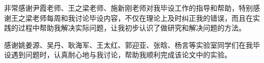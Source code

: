 
\begin{ack}
  非常感谢尹霞老师、王之梁老师、施新刚老师对我毕设工作的指导和帮助，特别感谢王之梁老师每周和我讨论毕设内容，不仅在理论上及时纠正我的错误，而且在实践的过程中帮助我解决实际问题，让我初步认识了做研究和解决问题的方法。

  感谢姚姜源、吴丹、耿海军、王太红、郭迎亚、张晗、杨言等实验室同学们在我毕设遇到问题时，认真耐心地与我讨论，帮助我顺利完成该论文中的实验。
\end{ack}
